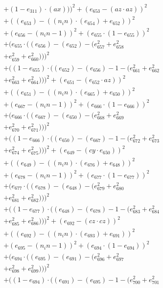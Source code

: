 \documentclass[10pt, a4paper]{article}
\begin{document}
\begin{align*}
& + (1 - e_{311})  \cdot  (ax)))^{2} + (e_{653} - (az  \cdot  az))^{2} \\
& + ((e_{653}) - ((n_in)  \cdot  (e_{654}) + e_{652}))^{2} \\
& + (e_{656} - (n_in - 1))^{2} + (e_{655}  \cdot  (1 - e_{655}))^{2} \\
& + (e_{655}  \cdot  ((e_{656}) - (e_{652}) - (e_{657}^{2} + e_{658}^{2} \\
& + e_{659}^{2} + e_{660}^{2})))^{2} \\
& + ((1 - e_{655})  \cdot  ((e_{652}) - (e_{656}) - 1 - (e_{661}^{2} + e_{662}^{2} \\
& + e_{663}^{2} + e_{664}^{2})))^{2} + (e_{651} - (e_{652}  \cdot  az))^{2} \\
& + ((e_{651}) - ((n_in)  \cdot  (e_{665}) + e_{650}))^{2} \\
& + (e_{667} - (n_in - 1))^{2} + (e_{666}  \cdot  (1 - e_{666}))^{2} \\
& + (e_{666}  \cdot  ((e_{667}) - (e_{650}) - (e_{668}^{2} + e_{669}^{2} \\
& + e_{670}^{2} + e_{671}^{2})))^{2} \\
& + ((1 - e_{666})  \cdot  ((e_{650}) - (e_{667}) - 1 - (e_{672}^{2} + e_{673}^{2} \\
& + e_{674}^{2} + e_{675}^{2})))^{2} + (e_{649} - (cy  \cdot  e_{650}))^{2} \\
& + ((e_{649}) - ((n_in)  \cdot  (e_{676}) + e_{648}))^{2} \\
& + (e_{678} - (n_in - 1))^{2} + (e_{677}  \cdot  (1 - e_{677}))^{2} \\
& + (e_{677}  \cdot  ((e_{678}) - (e_{648}) - (e_{679}^{2} + e_{680}^{2} \\
& + e_{681}^{2} + e_{682}^{2})))^{2} \\
& + ((1 - e_{677})  \cdot  ((e_{648}) - (e_{678}) - 1 - (e_{683}^{2} + e_{684}^{2} \\
& + e_{685}^{2} + e_{686}^{2})))^{2} + (e_{692} - (cz  \cdot  cz))^{2} \\
& + ((e_{692}) - ((n_in)  \cdot  (e_{693}) + e_{691}))^{2} \\
& + (e_{695} - (n_in - 1))^{2} + (e_{694}  \cdot  (1 - e_{694}))^{2} \\
& + (e_{694}  \cdot  ((e_{695}) - (e_{691}) - (e_{696}^{2} + e_{697}^{2} \\
& + e_{698}^{2} + e_{699}^{2})))^{2} \\
& + ((1 - e_{694})  \cdot  ((e_{691}) - (e_{695}) - 1 - (e_{700}^{2} + e_{701}^{2} \\

\end{align*}
\end{document}

